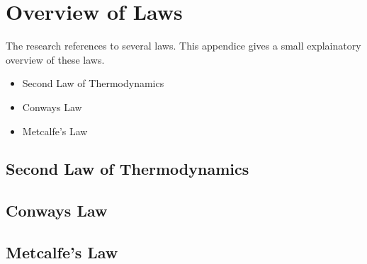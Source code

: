 \chapter{Overview of Laws}

The research references to several laws. This appendice gives a small explainatory overview of these laws.

\begin{itemize}
	\item{Second Law of Thermodynamics}
	\item{Conways Law}
	\item{Metcalfe's Law}
\end{itemize}

\section{Second Law of Thermodynamics}

\section{Conways Law}

\section{Metcalfe's Law}


